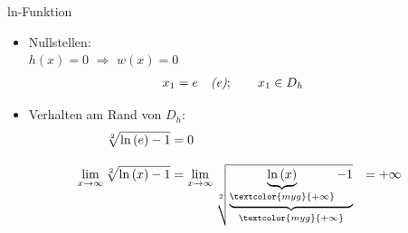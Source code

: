 \begin{Exercise}{ln-Funktion}{}
\begin{enumerate}
{\begin{itemize}[leftmargin=*]
{                }
            \item Nullstellen:\\[2.0ex]{
                $h(x) = 0$ \qquad $\Rightarrow$ \qquad $w(x) = 0$\\[-1.0ex]
                \begin{align*}
                    x_{1} &= e \quad \text{\textit{(e)}}; \qquad x_{1} \in D_{h} &&
                \end{align*}
                }
            \item Verhalten am Rand von $D_{h}$:\\{
                \vspace{-2.0ex}
                \begin{align*}
                    \sqrt[2]{\ln\left(e\right) - 1} &= 0 & &&\\[2.0ex]
                    \lim\limits_{x \to \infty} \sqrt[2]{\ln\left(x\right) - 1} &= \lim\limits_{x \to \infty} \sqrt[2]{\underbrace{\underbrace{\ln\left(x\right)}_{\textcolor{myg}{+\infty}} - 1}_{\textcolor{myg}{+ \infty}}} &= + \infty &&
                \end{align*}
                }
        \end{itemize}
        }
    \end{enumerate}
\end{Exercise}

